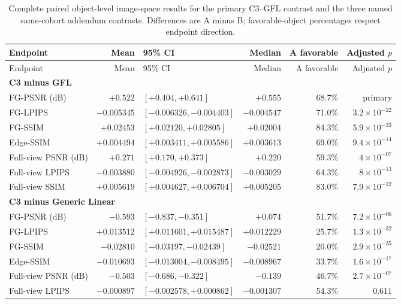 \documentclass[11pt]{article}
\begin{document}
\begingroup\scriptsize
\begin{longtable}{p{2.7cm}r l r r r}
\caption{Complete paired object-level image-space results for the primary C3--GFL contrast and the three named same-cohort addendum contrasts. Differences are A minus B; favorable-object percentages respect endpoint direction.}\label{tab:supp-freshc}\\
\toprule
Endpoint & Mean & 95\% CI & Median & A favorable & Adjusted $p$ \\
\midrule
\endfirsthead
\toprule Endpoint & Mean & 95\% CI & Median & A favorable & Adjusted $p$ \\
\midrule\endhead
\multicolumn{6}{l}{\textbf{C3 minus GFL}}\\
FG-PSNR (dB) & $+0.522$ & $[+0.404, +0.641]$ & $+0.555$ & 68.7\% & primary \\
FG-LPIPS & $-0.005345$ & $[-0.006326, -0.004403]$ & $-0.004547$ & 71.0\% & $3.2\times 10^{-22}$ \\
FG-SSIM & $+0.02453$ & $[+0.02120, +0.02805]$ & $+0.02004$ & 84.3\% & $5.9\times 10^{-33}$ \\
Edge-SSIM & $+0.004494$ & $[+0.003411, +0.005586]$ & $+0.003613$ & 69.0\% & $9.4\times 10^{-14}$ \\
Full-view PSNR (dB) & $+0.271$ & $[+0.170, +0.373]$ & $+0.220$ & 59.3\% & $4\times 10^{-07}$ \\
Full-view LPIPS & $-0.003880$ & $[-0.004926, -0.002873]$ & $-0.003029$ & 64.3\% & $8\times 10^{-13}$ \\
Full-view SSIM & $+0.005619$ & $[+0.004627, +0.006704]$ & $+0.005205$ & 83.0\% & $7.9\times 10^{-22}$ \\
\multicolumn{6}{l}{\textbf{C3 minus Generic Linear}}\\
FG-PSNR (dB) & $-0.593$ & $[-0.837, -0.351]$ & $+0.074$ & 51.7\% & $7.2\times 10^{-06}$ \\
FG-LPIPS & $+0.013512$ & $[+0.011601, +0.015487]$ & $+0.012229$ & 25.7\% & $1.3\times 10^{-32}$ \\
FG-SSIM & $-0.02810$ & $[-0.03197, -0.02439]$ & $-0.02521$ & 20.0\% & $2.9\times 10^{-35}$ \\
Edge-SSIM & $-0.010693$ & $[-0.013004, -0.008495]$ & $-0.008967$ & 33.7\% & $1.6\times 10^{-17}$ \\
Full-view PSNR (dB) & $-0.503$ & $[-0.686, -0.322]$ & $-0.139$ & 46.7\% & $2.7\times 10^{-07}$ \\
Full-view LPIPS & $-0.000897$ & $[-0.002578, +0.000862]$ & $-0.001307$ & 54.3\% & $0.611$ \\

\end{longtable}
\end{document}
